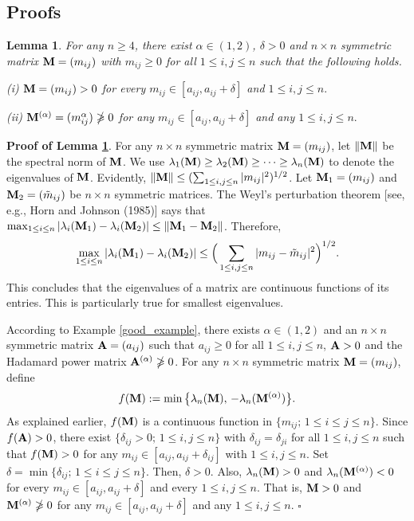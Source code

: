 \documentclass[conference,letterpaper]{IEEEtran}
\numberwithin{equation}{section}
\newcommand{\lbl}{\label}
\newcommand{\bd}{\bold}
\newcommand{\beaa}{\begin{eqnarray*}}
\newcommand{\eeaa}{\end{eqnarray*}}
\newcommand{\bea}{\begin{eqnarray}}
\newcommand{\eea}{\end{eqnarray}}
\newtheorem{lemma}{{\sc Lemma}}[section]
\begin{document}
\subsection{Proofs}\lbl{Proofs}
\begin{lemma}\lbl{what_is} For any $n\geq 4$, there exist $\alpha\in (1,2)$, $\delta>0$ and $n\times n$ symmetric matrix  $\bd{M}=(m_{ij})$ with $m_{ij}\geq 0$ for all $1\leq i, j \leq n$ such that the following holds.

(i) $\bd{M}=(m_{ij})>0$  for every $m_{ij}\in [a_{ij}, a_{ij}+\delta]$ and $1\leq i, j \leq n.$

(ii) $\bd{M}^{(\alpha)}=(m_{ij}^{\alpha})\ngeqslant 0$  for any $m_{ij}\in [a_{ij}, a_{ij}+\delta]$ and any $1\leq i, j \leq n.$
\end{lemma}
\noindent\textbf{Proof of Lemma \ref{what_is}}. For any $n\times n$ symmetric matrix $\bd{M}=(m_{ij})$, let  $\|\bd{M}\|$ be the spectral norm of $\bd{M}$. We use $\lambda_1(\bd{M})\geq \lambda_2(\bd{M})\geq \cdots \geq \lambda_n(\bd{M})$ to denote  the eigenvalues of $\bd{M}$.  Evidently, $\|\bd{M}\|\leq (\sum_{1\leq i, j \leq n}|m_{ij}|^2)^{1/2}$. Let $\bd{M}_1=(m_{ij})$ and $\bd{M}_2=(\tilde{m}_{ij})$ be $n\times n$ symmetric matrices. The Weyl's perturbation theorem [see, e.g., Horn and Johnson (1985)] says that
$\max_{1\leq i \leq n}|\lambda_i(\bd{M}_1)-\lambda_i(\bd{M}_2)|\leq \|\bd{M}_1-\bd{M}_2\|$.  Therefore,
\bea\lbl{flower_could}
\max_{1\leq i \leq n}|\lambda_i(\bd{M}_1)-\lambda_i(\bd{M}_2)|\leq \Big(\sum_{1\leq i, j \leq n}|m_{ij}-\tilde{m}_{ij}|^2\Big)^{1/2}.
\eea
This concludes that the eigenvalues of a matrix are continuous functions of its entries. This is particularly true for smallest eigenvalues.

According to Example \ref{good_example}, there exists  $\alpha\in (1, 2)$ and an $n\times n$ symmetric matrix $\bd{A}=(a_{ij})$ such that $a_{ij}\geq 0$ for all $1\leq i, j \leq n$, $\bd{A}>0$ and the Hadamard power matrix $\bd{A}^{(\alpha)} \ngeqslant 0$. For any $n\times n$ symmetric matrix  $\bd{M}=(m_{ij})$, define
\beaa
f(\bd{M}):=\min\big\{\lambda_n(\bd{M}),\, -\lambda_n(\bd{M}^{(\alpha)})\big\}.
\eeaa
As explained earlier, $f(\bd{M})$ is a continuous function in $\{m_{ij};\, 1\leq i\leq j \leq n\}$. Since $f(\bd{A})>0$, there exist $\{\delta_{ij}>0;\, 1\leq i, j\leq n\}$ with $\delta_{ij}=\delta_{ji}$ for all $1\leq i, j\leq n$ such that $f(\bd{M})>0$ for any  $m_{ij}\in [a_{ij}, a_{ij}+\delta_{ij}]$ with $1\leq i, j\leq n.$ Set $\delta= \min\{\delta_{ij};\, 1\leq i\leq j\leq n\}.$ Then, $\delta>0$. Also, $\lambda_n(\bd{M})>0$ and $\lambda_n(\bd{M}^{(\alpha)})<0$ for every $m_{ij}\in [a_{ij}, a_{ij}+\delta]$ and every $1\leq i, j\leq n.$ That is, $\bd{M}>0$  and $\bd{M}^{(\alpha)} \ngeqslant 0$  for any $m_{ij}\in [a_{ij}, a_{ij}+\delta]$ and any $1\leq i, j\leq n.$
\hfill$\square$
\end{document}
